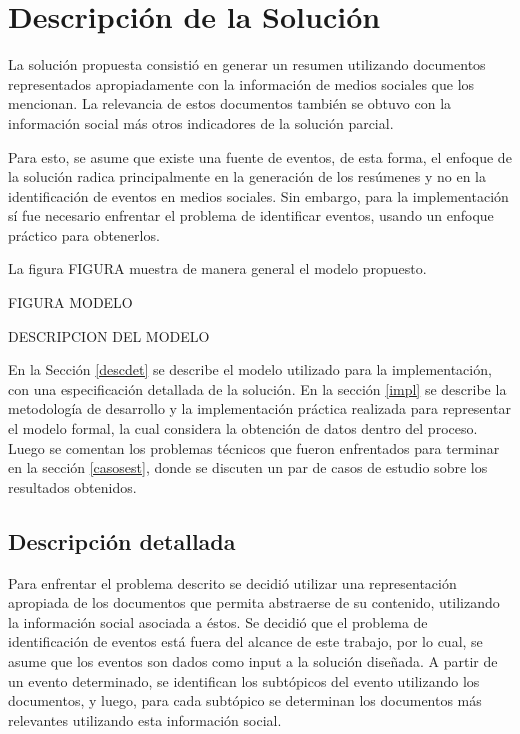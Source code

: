 
\chapter{Descripción de la Solución}
\label{sec-4}


  La solución propuesta consistió en generar un resumen utilizando
  documentos representados apropiadamente con la información de medios
  sociales que los mencionan. La relevancia de estos documentos
  también se obtuvo con la información social más otros indicadores de
  la solución parcial.

  Para esto, se asume que existe una fuente de eventos, de esta forma,
  el enfoque de la solución radica principalmente en la generación de
  los resúmenes y no en la identificación de eventos en medios
  sociales. Sin embargo, para la implementación sí fue necesario
  enfrentar el problema de identificar eventos, usando un enfoque
  práctico para obtenerlos.

  La figura FIGURA muestra de manera general el modelo propuesto.

  FIGURA MODELO

  DESCRIPCION DEL MODELO

  En la Sección \ref{descdet} se describe el modelo utilizado para la
  implementación, con una especificación detallada de la solución. En la
  sección \ref{impl} se describe la metodología de desarrollo y la
  implementación práctica realizada para representar el modelo
  formal, la cual considera la obtención de datos dentro del
  proceso. Luego se comentan los problemas técnicos que fueron
  enfrentados para terminar en la sección \ref{casosest}, donde se discuten
  un par de casos de estudio sobre los resultados obtenidos.

\section{Descripción detallada}
\label{sec-4.1}

\label{descdet}


   Para enfrentar el problema descrito se decidió utilizar una
   representación apropiada de los documentos que permita abstraerse
   de su contenido, utilizando la información social asociada a
   éstos. Se decidió que el problema de identificación de eventos está
   fuera del alcance de este trabajo, por lo cual, se asume que los
   eventos son dados como input a la solución diseñada. A partir de un
   evento determinado, se identifican los  subtópicos del evento
   utilizando los documentos, y luego, para cada
   subtópico se determinan los documentos más relevantes utilizando
   esta información social.

